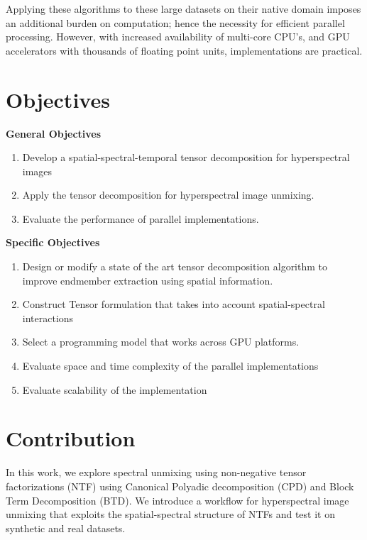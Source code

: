 Applying these algorithms to these large datasets on their native domain imposes an additional burden on computation; hence the necessity for efficient parallel processing.  However, with increased availability of multi-core CPU’s, and GPU accelerators with thousands of floating point units, implementations are practical.
\section{Objectives}
	\begin{raggedright}
		\textbf{General Objectives}
		\begin{enumerate}
			\item Develop a spatial-spectral-temporal tensor decomposition for hyperspectral
		images
			\item Apply the tensor decomposition for hyperspectral image unmixing.
			\item Evaluate the performance of parallel implementations.
		\end{enumerate}
		\textbf{Specific Objectives}
		\begin{enumerate}
			\item Design or modify a state of the art tensor decomposition algorithm to improve
			endmember extraction using spatial information.
			\item Construct Tensor formulation that takes into account spatial-spectral interactions
			\item Select a programming model that works across GPU platforms.
			\item Evaluate space and time complexity of the parallel implementations
			\item Evaluate scalability of the implementation 
		\end{enumerate}
	\end{raggedright}
\section{Contribution}
In this work, we explore spectral unmixing using non-negative tensor factorizations (NTF) using Canonical Polyadic decomposition (CPD) and Block Term Decomposition (BTD).  We introduce a workflow for hyperspectral image unmixing that exploits the spatial-spectral structure of NTFs and test it on synthetic and real datasets. 

